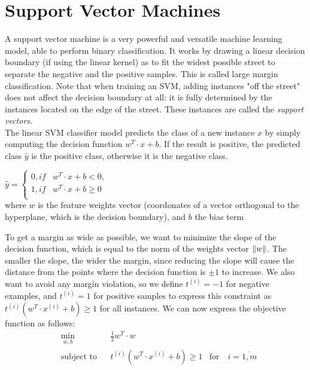 \section{Support Vector Machines}
A support vector machine is a very powerful and versatile machine learning model, able to perform binary classification. It works by drawing a linear decision boundary (if using the linear kernel) as to fit the widest possible street to separate the negative and the positive samples. This is called large margin classification. Note that when training an SVM, adding instances "off the street" does not affect the decision boundary at all: it is fully determined by the instances located on the edge of the street. These instances are called the \textit{support vectors}.\\
The linear SVM classifier model predicts the class of a new instance $x$ by simply computing the decision function $w^T \cdot x + b$. If the result is positive, the predicted class $\hat{y}$ is the positive class, otherwise it is the negative class. 
\begin{center}
$
\hat{y} = 
    \begin{cases}
        0, if & w^T \cdot x + b < 0,\\
        1, if & w^T \cdot x + b \geq 0 \\
\end{cases}
$\\
where $w$ is the feature weights vector (coordonates of a vector orthogonal to the hyperplane, which is the decision boundary), and $b$ the bias term
\end{center}
To get a margin as wide as possible, we want to minimize the slope of the decision function, which is equal to the norm of the weights vector $\left\lVert w\right\rVert$. The smaller the slope, the wider the margin, since reducing the slope will cause the distance from the points where the decision function is $\pm{1}$ to increase. We also want to avoid any margin violation, so we define $t^{(i)}=-1$ for negative examples, and $t^{(i)}=1$ for positive samples to express this constraint as $t^{(i)}(w^T \cdot x^{(i)} + b) \geq 1$ for all instances. We can now express the objective function as follows:
\begin{equation}
\begin{aligned}
& \underset{w,b}{\text{min}}
& & \frac{1}{2} w^T \cdot w \\
& \text{subject to}
& & t^{(i)} (w^T \cdot x^{(i)} + b) \geq 1 & \text{for} \quad i=\overline{1,m}
\end{aligned}
\end{equation}
